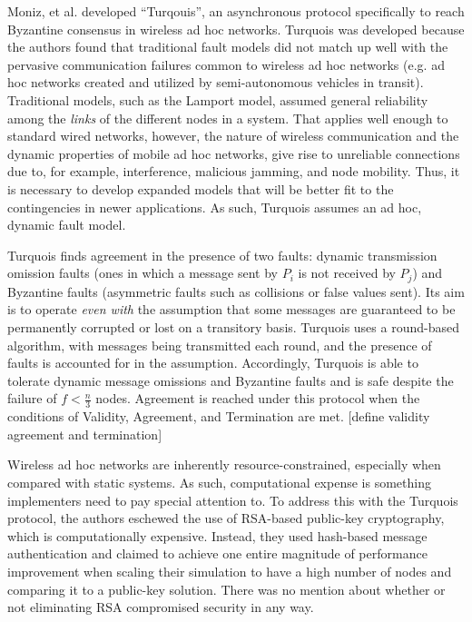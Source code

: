\documentclass[twoside, conference]{IEEEtran}
\begin{document}

Moniz, et al. developed ``Turqouis'', an asynchronous protocol specifically to reach Byzantine consensus in wireless ad hoc networks. Turquois was developed because the authors found that traditional fault models did not match up well with the pervasive communication failures common to wireless ad hoc networks (e.g. ad hoc networks created and utilized by semi-autonomous vehicles in transit). Traditional models, such as the Lamport model, assumed general reliability among the \textit{links} of the different nodes in a system. That applies well enough to standard wired networks, however, the nature of wireless communication and the dynamic properties of mobile ad hoc networks, give rise to unreliable connections due to, for example, interference, malicious jamming, and node mobility. Thus, it is necessary to develop expanded models that will be better fit to the contingencies in newer applications. As such, Turquois assumes an ad hoc, dynamic fault model. \cite{Moniz2013}

Turquois finds agreement in the presence of two faults: dynamic transmission omission faults (ones in which a message sent by $P_i$ is not received by $P_j$) and Byzantine faults (asymmetric faults such as collisions or false values sent). Its aim is to operate \textit{even with} the assumption that some messages are guaranteed to be permanently corrupted or lost on a transitory basis. Turquois uses a  round-based algorithm, with messages being transmitted each round, and the presence of faults is accounted for in the assumption. Accordingly, Turquois is able to tolerate dynamic message omissions and Byzantine faults and is safe despite the failure of $f < \frac{n}{3}$ nodes. Agreement is reached under this protocol when the conditions of Validity, Agreement, and Termination are met. \cite{Moniz2013} [define validity agreement and termination]

Wireless ad hoc networks are inherently resource-constrained, especially when compared with static systems. As such, computational expense is something implementers need to pay special attention to. To address this with the Turquois protocol, the authors eschewed the use of RSA-based public-key cryptography, which is computationally expensive. Instead, they used hash-based message authentication and claimed to achieve one entire magnitude of performance improvement when scaling their simulation to have a high number of nodes and comparing it to a public-key solution. There was no mention about whether or not eliminating RSA compromised security in any way. \cite{Moniz2013}
\end{document}
